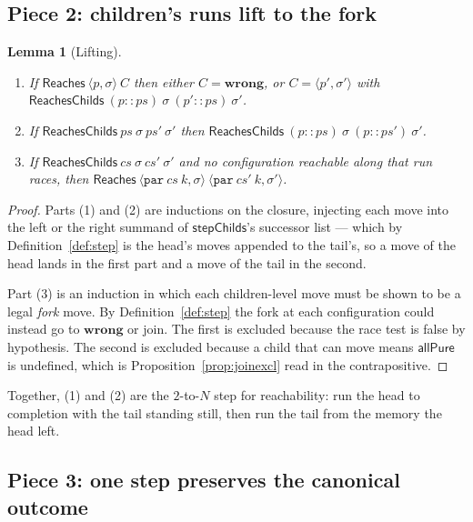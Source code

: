 \documentclass[11pt,a4paper]{article}
\theoremstyle{definition}
\theoremstyle{plain}
\newtheorem{lemma}[definition]{Lemma}
\theoremstyle{remark}
\newcommand{\st}{\sigma}
\newcommand{\Reaches}{\mathsf{Reaches}}
\newcommand{\wrong}{\mathbf{wrong}}
\begin{document}
\subsection{Piece 2: children's runs lift to the fork}

\begin{lemma}[Lifting]\label{lem:lift}
\begin{enumerate}[leftmargin=1.8em,itemsep=1pt]
\item If $\Reaches\ \langle p, \st\rangle\ C$ then either $C = \wrong$, or $C = \langle p', \st'\rangle$ with $\mathsf{ReachesChilds}\ (p :: ps)\ \st\ (p' :: ps)\ \st'$.
\item If $\mathsf{ReachesChilds}\ ps\ \st\ ps'\ \st'$ then $\mathsf{ReachesChilds}\ (p :: ps)\ \st\ (p :: ps')\ \st'$.
\item If $\mathsf{ReachesChilds}\ cs\ \st\ cs'\ \st'$ and no configuration reachable along that run races, then $\Reaches\ \langle\texttt{par}\ cs\ k, \st\rangle\ \langle\texttt{par}\ cs'\ k, \st'\rangle$.
\end{enumerate}
\end{lemma}

\begin{proof}
Parts (1) and (2) are inductions on the closure, injecting each move into the left or the
right summand of $\mathsf{stepChilds}$'s successor list --- which by
Definition~\ref{def:step} is the head's moves appended to the tail's, so a move of the head
lands in the first part and a move of the tail in the second.

Part (3) is an induction in which each children-level move must be shown to be a legal
\emph{fork} move. By Definition~\ref{def:step} the fork at each configuration could instead
go to $\wrong$ or join. The first is excluded because the race test is false by hypothesis.
The second is excluded because a child that can move means $\mathsf{allPure}$ is undefined,
which is Proposition~\ref{prop:joinexcl} read in the contrapositive.
\end{proof}

Together, (1) and (2) are the $2$-to-$N$ step for reachability: run the head to completion
with the tail standing still, then run the tail from the memory the head left.

\subsection{Piece 3: one step preserves the canonical outcome}\label{sec:canonical:conserve}
\end{document}
